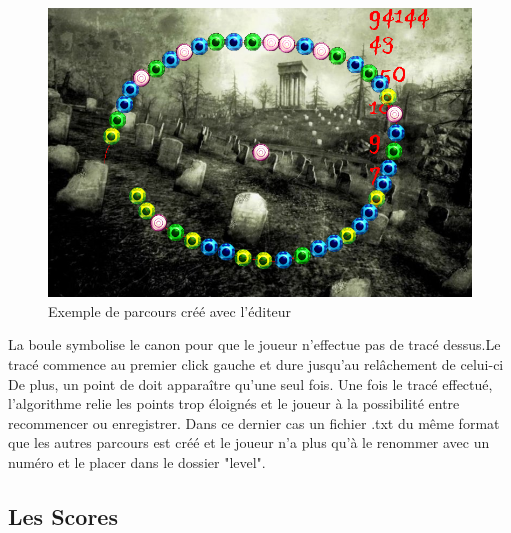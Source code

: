 \begin{figure}[H]
\begin{center}
\includegraphics[scale=0.4]{img/bonparcours.png}
\caption {Exemple de parcours créé avec l'éditeur}
\end{center}
\end{figure}
La boule symbolise le canon pour que le joueur n'effectue pas de tracé dessus.Le tracé commence au premier click gauche et dure jusqu'au relâchement de celui-ci De plus, un point de doit apparaître qu'une seul fois. Une fois le tracé effectué, l'algorithme relie les points trop éloignés et le joueur à la possibilité entre recommencer ou enregistrer. Dans ce dernier cas un fichier .txt du même format que les autres parcours est créé et le joueur n'a plus qu'à le renommer avec un numéro et le placer dans le dossier "level".


\subsection{Les Scores}

